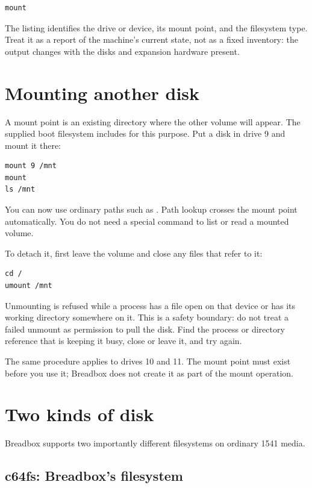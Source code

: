 \begin{lstlisting}
mount
\end{lstlisting}

The listing identifies the drive or device, its mount point, and the filesystem type. Treat it as a report of the machine's current state, not as a fixed inventory: the output changes with the disks and expansion hardware present.

\section{Mounting another disk}

A mount point is an existing directory where the other volume will appear. The supplied boot filesystem includes  for this purpose. Put a disk in drive 9 and mount it there:

\begin{lstlisting}
mount 9 /mnt
mount
ls /mnt
\end{lstlisting}

You can now use ordinary paths such as . Path lookup crosses the mount point automatically. You do not need a special command to list or read a mounted volume.

To detach it, first leave the volume and close any files that refer to it:

\begin{lstlisting}
cd /
umount /mnt
\end{lstlisting}

Unmounting is refused while a process has a file open on that device or has its working directory somewhere on it. This is a safety boundary: do not treat a failed unmount as permission to pull the disk. Find the process or directory reference that is keeping it busy, close or leave it, and try again.

The same procedure applies to drives 10 and 11. The mount point must exist before you use it; Breadbox does not create it as part of the mount operation.

\section{Two kinds of disk}

Breadbox supports two importantly different filesystems on ordinary 1541 media.

\subsection{c64fs: Breadbox's filesystem}

